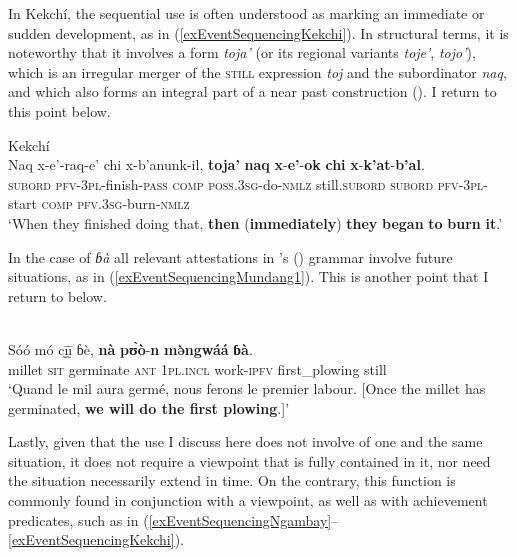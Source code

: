In Kekchí, the sequential use is often understood as marking an immediate or sudden development, as in (\ref{exEventSequencingKekchi}). In structural terms, it is noteworthy that it involves a form \textit{toja\rq{}} (or its regional variants \textit{toje\rq}, \textit{tojo\rq}), which is an irregular merger of the \textsc{still} expression \textit{toj} and the subordinator \textit{naq}, and which also forms an integral part of a near past construction (). I return to this point below.\pagebreak

\begin{exe}
	\ex Kekchí\label{exEventSequencingKekchi}\\
	\gll Naq x-e'-raq-e' chi x-b'anunk-il, \textbf{toja'} \textbf{naq} \textbf{x}-\textbf{e'}-\textbf{ok} \textbf{chi} \textbf{x}-\textbf{k'at}-\textbf{b'al}.\\
	\textsc{subord} \textsc{pfv}-3\textsc{pl}-finish-\textsc{pass} \textsc{comp} \textsc{poss}.3\textsc{sg}-do-\textsc{nmlz} still.\textsc{subord} \textsc{subord} \textsc{pfv}-3\textsc{pl}-start \textsc{comp} \textsc{pfv}.3\textsc{sg}-burn-\textsc{nmlz}\\
	\glt \lq When they finished doing that, \textbf{then} (\textbf{immediately}) \textbf{they} \textbf{began} \textbf{to} \textbf{burn} \textbf{it}.' \parencite[468]{Kockelman2020}
\end{exe}

In the case of  \textit{ɓà} all relevant attestations in \citeauthor{Elders2000}'s (\citeyear{Elders2000}) grammar involve future situations, as in (\ref{exEventSequencingMundang1}). This is another point that I return to below.

\begin{exe}
	\ex {}\label{exEventSequencingMundang1}\\
		\gll Sóó mó cḭ̄ḭ̄ ɓè, \textbf{nà} \textbf{pʊ̀ò}-\textbf{n} \textbf{mə̀ngwáá} \textbf{ɓà}.\\
millet \textsc{sit} germinate \textsc{ant} 1\textsc{pl}.\textsc{incl} work-\textsc{ipfv} first\_plowing still\\
\glt \lq Quand le mil aura germé, nous ferons le premier labour. [Once the millet has germinated, \textbf{we will do the first plowing}.]\rq{ }\parencite[383]{Elders2000}
\end{exe}

Lastly, given that the use I discuss here does not involve  of one and the same situation, it does not require a viewpoint that is fully contained in it, nor need the situation necessarily extend in time. On the contrary, this function is commonly found in conjunction with a  viewpoint, as well as with achievement predicates, such as in (\ref{exEventSequencingNgambay}–\ref{exEventSequencingKekchi}).

